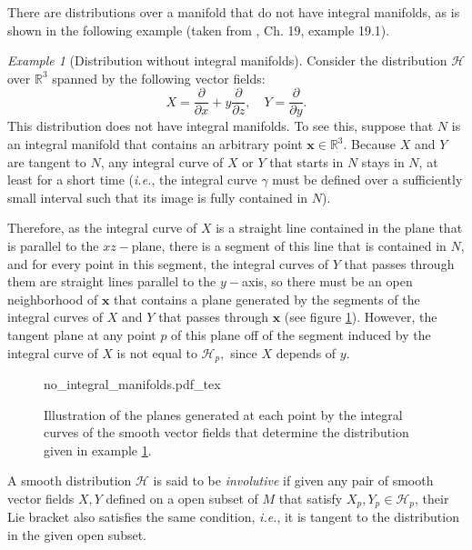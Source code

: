 \documentclass[12pt, letterpaper, reqno]{amsart}
\newcommand{\incfig}[2][1]{%
    \def\svgwidth{#1\columnwidth}
    {#2.pdf_tex}
}
\theoremstyle{definition}
\theoremstyle{plain}
\theoremstyle{remark}
\newtheorem{ex}{Example}
\begin{document}
There are distributions over a manifold that do not have integral manifolds, as is shown in the following example (taken from \cite{lee2003introduction}, Ch. 19, example 19.1).

\begin{ex}[Distribution without integral manifolds] \label{ex:no_integral_manifolds}
	Consider the distribution $ \mathcal{H} $ over $ \mathbb{R}^3 $ spanned by the following vector fields: 
	$$ X = \frac{\partial}{\partial x} + y \frac{\partial}{\partial z}, \quad Y = \frac{\partial}{\partial y}.  $$ 
	This distribution does not have integral manifolds. To see this, suppose that $ N $ is an integral manifold that contains an arbitrary point $ \textbf{x} \in \mathbb{R}^3.  $ Because $ X $ and $ Y $ are tangent to $ N $, any integral curve of $ X $ or $ Y $ that starts in $ N $ stays in $ N $, at least for a short time (\textit{i.e.}, the integral curve $ \gamma $ must be defined over a sufficiently small interval such that its image is fully contained in $ N $).   

	Therefore, as the integral curve of $ X $ is a straight line contained in the plane that is parallel to the $ xz- $plane, there is a segment of this line that is contained in $ N $, and for every point in this segment, the integral curves of $ Y $ that passes through them are straight lines parallel to the $ y- $axis, so there must be an open neighborhood of $ \textbf{x}  $ that contains a plane generated by the segments of the integral curves of $ X $ and $ Y $ that passes through $ \textbf{x}$ (see figure \ref{fig:no_integral_manifolds}). However, the tangent plane at any point $ p $  of this plane  off of the segment induced by the integral curve of $ X $ is not equal to $ \mathcal{H}_p, $ since $ X $ depends of $ y $.   
\end{ex}

\begin{figure}
    \centering
    \incfig{no_integral_manifolds}
    \caption{Illustration of the planes generated at each point by the integral curves of the smooth vector fields that determine the distribution given in example \ref{ex:no_integral_manifolds}.}
    \label{fig:no_integral_manifolds}
\end{figure}

A smooth distribution $ \mathcal{H} $ is said to be \textit{involutive} if given any pair of smooth vector fields $ X,Y $ defined on a open subset of $ M $  that satisfy $X_p,Y_p\in \mathcal{H}_p $, their Lie bracket also satisfies the same condition, \textit{i.e.}, it is tangent to the distribution in the given open subset. 
\end{document}
